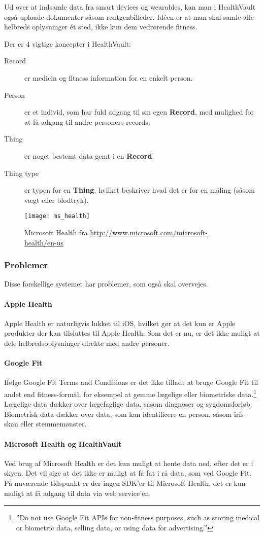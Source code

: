 Ud over at indsamle data fra smart devices og wearables, kan man i HealthVault også uploade dokumenter såsom røntgenbilleder.
Idéen er at man skal samle alle helbreds oplysninger ét sted, ikke kun dem vedrørende fitness.

Der er 4 vigtige koncepter i HealthVault:
\begin{description}
\item[Record] er medicin og fitness information for en enkelt person.
\item[Person] er et individ, som har fuld adgang til sin egen \textbf{Record}, med mulighed for at få adgang til andre personers records.
\item[Thing] er noget bestemt data gemt i en \textbf{Record}.
\item[Thing type] er typen for en \textbf{Thing}, hvilket beskriver hvad det er for en måling (såsom vægt eller blodtryk).
\end{description}

\begin{figure}
\centering
\texttt{[image: ms\_health]}
\caption{Microsoft Health fra \url{http://www.microsoft.com/microsoft-health/en-us}}
\label{eksisterende_systemer:ms_health_fig}
\end{figure}

\subsubsection{Problemer}
Disse forskellige systemet har problemer, som også skal overvejes.

\paragraph{Apple Health}
Apple Health er naturligvis lukket til iOS, hvilket gør at det kun er Apple produkter der kan tilsluttes til Apple Health.
Som det er nu, er det ikke muligt at dele helbredsoplysninger direkte med andre personer.

\paragraph{Google Fit}
Ifølge Google Fit Terms and Conditions er det ikke tilladt at bruge Google Fit til andet end fitness-formål, for eksempel at gemme lægelige eller biometriske data.\footnote{''Do not use Google Fit APIs for non-fitness purposes, such as storing medical or biometric data, selling data, or using data for advertising.''}
Lægelige data dækker over lægefaglige data, såsom diagnoser og sygdomsforløb.
Biometrisk data dækker over data, som kan identificere en person, såsom iris-skan eller stemmemønster.

\paragraph{Microsoft Health og HealthVault}
Ved brug af Microsoft Health er det kun muligt at hente data ned, efter det er i skyen.
Det vil sige at det ikke er muligt at få fat i rå data, som ved Google Fit.
På nuværende tidspunkt er der ingen SDK'er til Microsoft Health, det er kun muligt at få adgang til data via web service'en.
